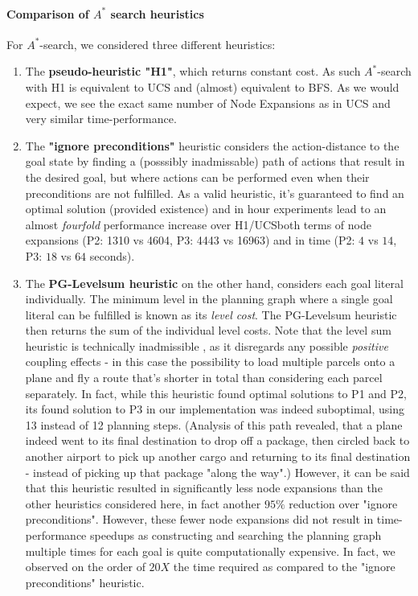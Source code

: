 \documentclass{article}
\theoremstyle{plain}
\theoremstyle{definition}
\theoremstyle{remark}
\begin{document}
\paragraph{Comparison of $A^*$ search heuristics}

For $A^*$-search, we considered three different heuristics:
\begin{enumerate}
	\item The \textbf{pseudo-heuristic "H1"}, which returns constant cost. As such $A^*$-search with H1 is equivalent to UCS and (almost) equivalent to BFS. As we would expect, we see the exact same number of Node Expansions as in UCS and very similar time-performance.
	\item The \textbf{"ignore preconditions"} heuristic considers the action-distance to the goal state by finding a (posssibly inadmissable) path of actions that result in the desired goal, but where actions can be performed even when their preconditions are not fulfilled. As a valid heuristic, it's guaranteed to find an optimal solution (provided existence) and in hour experiments lead to an almost \emph{fourfold} performance increase over H1/UCS\textemdash both terms of node expansions (P2: 1310 vs 4604, P3: 4443 vs 16963) and in time (P2: $4$ vs $14$, P3: $18$ vs $64$ seconds).
	\item The \textbf{PG-Levelsum heuristic} on the other hand, considers each goal literal individually. The minimum level in the planning graph where a single goal literal can be fulfilled is known as its \emph{level cost}. The PG-Levelsum heuristic then returns the sum of the individual level costs.
	Note that the level sum heuristic is technically inadmissible \cite[p. 382]{russell2009artificial}, as it disregards any possible \emph{positive} coupling effects - in this case the possibility to load multiple parcels onto a plane and fly a route that's shorter in total than considering each parcel separately. In fact, while this heuristic found optimal solutions to P1 and P2, its found solution to P3 in our implementation was indeed suboptimal, using 13 instead of 12 planning steps. (Analysis of this path revealed, that a plane indeed went to its final destination to drop off a package, then circled back to another airport to pick up another cargo and returning to its final destination - instead of picking up that package "along the way".) However, it can be said that this heuristic resulted in significantly less node expansions than the other heuristics considered here, in fact another $95\%$ reduction over "ignore preconditions". However, these fewer node expansions did not result in time-performance speedups as constructing and searching the planning graph multiple times for each goal is quite computationally expensive. In fact, we observed on the order of $20X$ the time required as compared to the "ignore preconditions" heuristic.
\end{enumerate}
\end{document}
